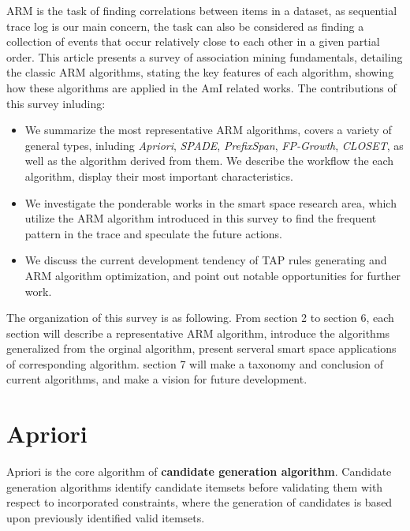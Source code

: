 \documentclass[sigplan, screen]{acmart}
\begin{document}
ARM is the task of finding correlations between items in a dataset, as sequential trace log is our main concern, the task can also 
be considered as finding a collection of events that occur relatively close to each other in a given partial order. This article presents 
a survey of association mining fundamentals, detailing the classic ARM algorithms, stating the key features of each 
algorithm, showing how these algorithms are applied in the AmI related works. The contributions of this survey inluding:
\begin{itemize}
  \item We summarize the most representative ARM algorithms, covers a variety of general types, inluding \emph{Apriori}, \emph{SPADE}, 
  \emph{PrefixSpan}, \emph{FP-Growth}, \emph{CLOSET}, as well as the algorithm derived from them. We describe the workflow the each algorithm, 
  display their most important characteristics.
  \item We investigate the ponderable works in the smart space research area, which utilize the ARM algorithm introduced in this survey to find 
  the frequent pattern in the trace and speculate the future actions.
  \item We discuss the current development tendency of TAP rules generating and ARM algorithm optimization, and point out notable opportunities for further work.
\end{itemize}
The organization of this survey is as following. From section 2 to section 6, each section will describe a representative ARM algorithm, introduce
the algorithms generalized from the orginal algorithm, present serveral smart space applications of corresponding algorithm. section 7 will make a
taxonomy and conclusion of current algorithms, and make a vision for future development.

\section{Apriori}
Apriori\cite{agrawal1993mining,agrawal1994fast} is the core algorithm of \textbf{candidate generation algorithm}. Candidate generation algorithms 
identify candidate itemsets before validating them with respect to incorporated constraints, where the generation of candidates is based
upon previously identified valid itemsets. 
\end{document}
